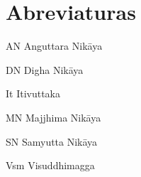 \chapter*{Abreviaturas}

AN Anguttara Nikāya

DN Digha Nikāya

It Itivuttaka

MN Majjhima Nikāya

SN Samyutta Nikāya

Vsm Visuddhimagga